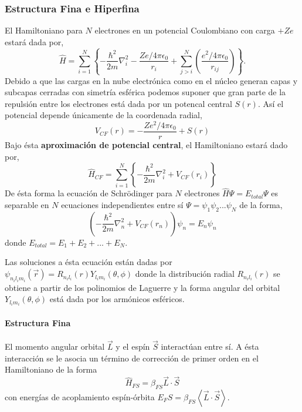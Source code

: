 \subsubsection{Estructura Fina e Hiperfina}
El Hamiltoniano para $N$ electrones en un potencial Coulombiano con carga $+Ze$ estará dada por, 
\begin{equation}
    \hat{H} = \sum_{i=1}^N \left\{ - \frac{\hbar^2}{2m} \nabla_i^2 - \frac{Ze/4 \pi \epsilon_0}{r_i} + \sum_{j>i}^N\left( \frac{e^2/ 4 \pi \epsilon_0}{r_{ij}}\right)\right\}.
\end{equation}
Debido a que las cargas en la nube electrónica como en el núcleo generan capas y subcapas cerradas con simetría esférica podemos suponer que gran parte de la repulsión entre los electrones está dada por un potencal central $S(r)$. Así el potencial depende únicamente de la coordenada radial,
\begin{equation}
    V_{CF} (r) = - \frac{Ze^2/4 \pi \epsilon_0}{r} + S(r)
\end{equation}
Bajo ésta \textbf{aproximación de potencial central}, el Hamiltoniano estará dado por,
\begin{equation}
    \hat{H}_{CF} = \sum_{i=1}^N \left\{-\frac{\hbar^2}{2m} \nabla_i^2 + V_{CF}(r_i)\right\}
\end{equation}
De ésta forma la ecuación de Schrödinger para $N$ electrones $\hat{H} \Psi = E_{total} \Psi$ es separable en $N$ ecuaciones independientes entre sí $\Psi = \psi_1 \psi_2 ... \psi_N$ de la forma,
\begin{equation}
    \left( - \frac{\hbar^2}{2m} \nabla_n^2 + V_{CF}(r_n) \right) \psi_n = E_n \psi_n
\end{equation}
donde $E_{total} = E_1 + E_2 + ...+ E_N$. 

Las soluciones a ésta ecuación están dadas por $\psi_{n_i l_i m_i}(\vec{r}) = R_{n_i l_i}(r) Y_{l_i m_i}(\theta, \phi)$ donde la distribución radial $R_{n_i l_i}(r)$ se obtiene a partir de los polinomios de Laguerre y la forma angular del orbital $Y_{l_i m_i}(\theta, \phi)$ está dada por los armónicos esféricos.

\paragraph{Estructura Fina}
El momento angular orbital $\vec{L}$ y el espín $\vec{S}$ interactúan entre sí. A ésta interacción se le asocia un término de corrección de primer orden en el Hamiltoniano de la forma 
\begin{equation}
\hat{H}_{FS} = \beta_{FS} \vec{L} \cdot \vec{S}
\end{equation}
con energías de acoplamiento espín-órbita $E_FS = \beta_{FS} \left\langle \vec{L} \cdot \vec{S} \right\rangle$. 


